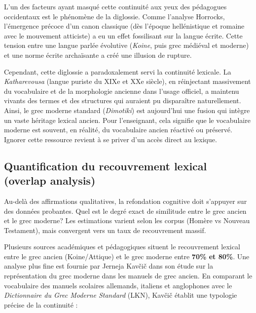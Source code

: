 L'un des facteurs ayant masqué cette continuité aux yeux des pédagogues occidentaux est le phénomène
de la diglossie. Comme l'analyse Horrocks, l'émergence précoce d'un canon classique (dès l'époque
hellénistique et romaine avec le mouvement atticiste) a eu un effet fossilisant sur la langue
écrite.\cite{ref3} Cette tension entre une langue parlée évolutive (\textit{Koine}, puis grec
médiéval et moderne) et une norme écrite archaïsante a créé une illusion de rupture.

Cependant, cette diglossie a paradoxalement servi la continuité lexicale. La \textit{Katharevousa}
(langue puriste du XIXe et XXe siècle), en réinjectant massivement du vocabulaire et de la
morphologie ancienne dans l'usage officiel, a maintenu vivants des termes et des structures qui
auraient pu disparaître naturellement.\cite{ref2} Ainsi, le grec moderne standard
(\textit{Dimotiki}) est aujourd'hui une fusion qui intègre un vaste héritage lexical ancien. Pour
l'enseignant, cela signifie que le vocabulaire \og moderne\fg{} est souvent, en réalité, du
vocabulaire ancien réactivé ou préservé. Ignorer cette ressource revient à se priver d'un accès
direct au lexique.



\subsection{Quantification du recouvrement lexical (overlap analysis)}

Au-delà des affirmations qualitatives, la refondation cognitive doit s'appuyer sur des données
probantes. Quel est le degré exact de similitude entre le grec ancien et le grec moderne? Les
estimations varient selon les corpus (Homère vs Nouveau Testament), mais convergent vers un taux de
recouvrement massif.

Plusieurs sources académiques et pédagogiques situent le recouvrement lexical entre le grec ancien
(Koine/Attique) et le grec moderne entre \textbf{70\% et 80\%}.\cite{ref11} Une analyse plus fine
est fournie par Jerneja Kavčič dans son étude sur la représentation du grec moderne dans les manuels
de grec ancien.\cite{ref15} En comparant le vocabulaire des manuels scolaires allemands, italiens et
anglophones avec le \textit{Dictionnaire du Grec Moderne Standard} (LKN), Kavčič établit une
typologie précise de la continuité :

